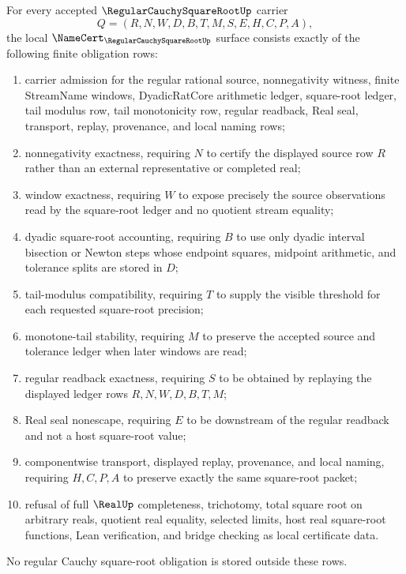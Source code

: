 
\begin{theorem}
\label{thm:regular-cauchy-square-root-namecert-obligations}
For every accepted $\RegularCauchySquareRootUp$ carrier
$$
Q=(R,N,W,D,B,T,M,S,E,H,C,P,A),
$$
the local $\NameCert_{\RegularCauchySquareRootUp}$ surface consists exactly of the following finite obligation rows:
\begin{enumerate}
\item carrier admission for the regular rational source, nonnegativity witness, finite StreamName windows, DyadicRatCore arithmetic ledger, square-root ledger, tail modulus row, tail monotonicity row, regular readback, Real seal, transport, replay, provenance, and local naming rows;
\item nonnegativity exactness, requiring $N$ to certify the displayed source row $R$ rather than an external representative or completed real;
\item window exactness, requiring $W$ to expose precisely the source observations read by the square-root ledger and no quotient stream equality;
\item dyadic square-root accounting, requiring $B$ to use only dyadic interval bisection or Newton steps whose endpoint squares, midpoint arithmetic, and tolerance splits are stored in $D$;
\item tail-modulus compatibility, requiring $T$ to supply the visible threshold for each requested square-root precision;
\item monotone-tail stability, requiring $M$ to preserve the accepted source and tolerance ledger when later windows are read;
\item regular readback exactness, requiring $S$ to be obtained by replaying the displayed ledger rows $R,N,W,D,B,T,M$;
\item Real seal nonescape, requiring $E$ to be downstream of the regular readback and not a host square-root value;
\item componentwise transport, displayed replay, provenance, and local naming, requiring $H,C,P,A$ to preserve exactly the same square-root packet;
\item refusal of full $\RealUp$ completeness, trichotomy, total square root on arbitrary reals, quotient real equality, selected limits, host real square-root functions, Lean verification, and bridge checking as local certificate data.
\end{enumerate}
No regular Cauchy square-root obligation is stored outside these rows.
\end{theorem}

